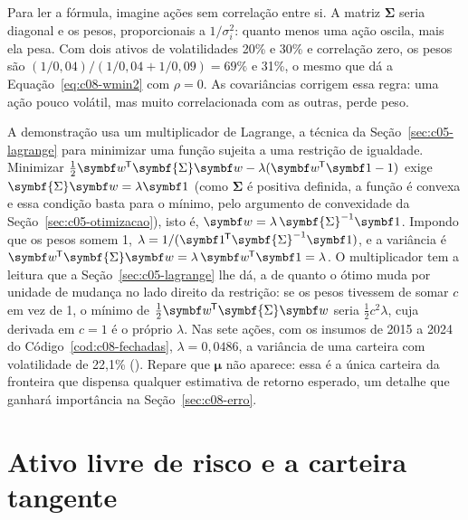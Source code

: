 Para ler a fórmula, imagine ações sem correlação entre si. A matriz $\symbf{\Sigma}$ seria diagonal e os pesos, proporcionais a $1/\sigma_i^2$: quanto menos uma ação oscila, mais ela pesa. Com dois ativos de volatilidades 20\% e 30\% e correlação zero, os pesos são $(1/0,04)/(1/0,04 + 1/0,09) = 69\%$ e 31\%, o mesmo que dá a Equação~\eqref{eq:c08-wmin2} com $\rho = 0$. As covariâncias corrigem essa regra: uma ação pouco volátil, mas muito correlacionada com as outras, perde peso.

A demonstração usa um multiplicador de Lagrange, a técnica da Seção~\ref{sec:c05-lagrange} para minimizar uma função sujeita a uma restrição de igualdade. Minimizar $\tfrac12\vetor{w}\T\symbf{\Sigma}\vetor{w} - \lambda(\vetor{w}\T\vetor{1} - 1)$ exige $\symbf{\Sigma}\vetor{w} = \lambda\vetor{1}$ (como $\symbf{\Sigma}$ é positiva definida, a função é convexa e essa condição basta para o mínimo, pelo argumento de convexidade da Seção~\ref{sec:c05-otimizacao}), isto é, $\vetor{w} = \lambda\,\symbf{\Sigma}^{-1}\vetor{1}$. Impondo que os pesos somem 1, $\lambda = 1/(\vetor{1}\T\symbf{\Sigma}^{-1}\vetor{1})$, e a variância é $\vetor{w}\T\symbf{\Sigma}\vetor{w} = \lambda\,\vetor{w}\T\vetor{1} = \lambda$. O multiplicador tem a leitura que a Seção~\ref{sec:c05-lagrange} lhe dá, a de quanto o ótimo muda por unidade de mudança no lado direito da restrição: se os pesos tivessem de somar $c$ em vez de 1, o mínimo de $\tfrac12\vetor{w}\T\symbf{\Sigma}\vetor{w}$ seria $\tfrac12 c^2\lambda$, cuja derivada em $c = 1$ é o próprio $\lambda$. Nas sete ações, com os insumos de 2015 a 2024 do Código~\ref{cod:c08-fechadas}, $\lambda = 0,0486$, a variância de uma carteira com volatilidade de 22,1\% (). Repare que $\symbf{\mu}$ não aparece: essa é a única carteira da fronteira que dispensa qualquer estimativa de retorno esperado, um detalhe que ganhará importância na Seção~\ref{sec:c08-erro}.

\section{Ativo livre de risco e a carteira tangente}
\label{sec:c08-tangente}

